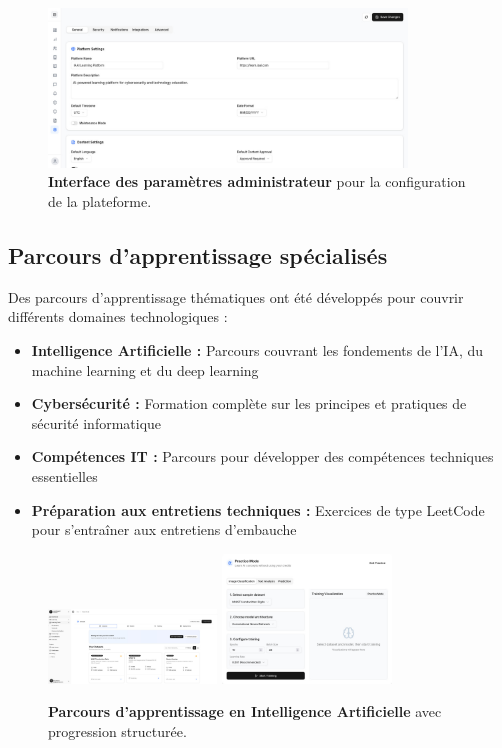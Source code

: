 \begin{figure}[H]
  \centering
  \includegraphics[width=0.85\textwidth,keepaspectratio]{old-reports/week_4_img/settings_admin.jpeg}
  \caption{\textbf{Interface des paramètres administrateur} pour la configuration de la plateforme.}
  \label{fig:admin_settings}
\end{figure}

\subsection{Parcours d'apprentissage spécialisés}

Des parcours d'apprentissage thématiques ont été développés pour couvrir différents domaines technologiques :

\begin{itemize}
  \item \textbf{Intelligence Artificielle :} Parcours couvrant les fondements de l'IA, du machine learning et du deep learning
  \item \textbf{Cybersécurité :} Formation complète sur les principes et pratiques de sécurité informatique
  \item \textbf{Compétences IT :} Parcours pour développer des compétences techniques essentielles
  \item \textbf{Préparation aux entretiens techniques :} Exercices de type LeetCode pour s'entraîner aux entretiens d'embauche
\end{itemize}

\begin{figure}[H]
  \centering
  \includegraphics[width=0.4\textwidth,keepaspectratio]{old-reports/week_4_img/ai_1.jpeg}
  \includegraphics[width=0.4\textwidth,keepaspectratio]{old-reports/week_4_img/ai_2.jpeg}
  \caption{\textbf{Parcours d'apprentissage en Intelligence Artificielle} avec progression structurée.}
  \label{fig:ai_learning_path}
\end{figure}

